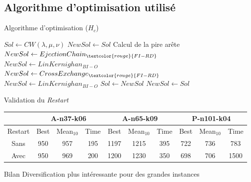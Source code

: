 \documentclass{beamer}
\begin{document}
\subsection{Algorithme d'optimisation utilisé}

\begin{frame}{Algorithme d'optimisation ($H_c$)}

\begin{algorithm}[H]
\DontPrintSemicolon %

$Sol \gets CW(\lambda,\mu,\nu)$\;
$NewSol \gets Sol$\;
 {
	Calcul de la pire arête\;
	$NewSol \gets EjectionChain_{\textcolor{rouge}{FI-RD}}$\;
	$NewSol \gets LinKernighan_{BI-O}$\;
	$NewSol \gets CrossExchange_{\textcolor{rouge}{FI-RD}}$\;
	$NewSol \gets LinKernighan_{BI-O}$\;
	 {
		$Sol \gets NewSol$\;
	}
	\textcolor{rouge}{
	 {  
		$NewSol \gets Sol$  
	}
	}
}
\;

\end{algorithm}

\end{frame}

\begin{frame}{Validation du \emph{Restart}}

\begin{table}[H]
\begin{tabular}{|@{}c@{}|@{}c@{}|@{}c@{}|@{}c@{}|@{}c@{}|@{}c@{}|@{}c@{}|@{}c@{}|@{}c@{}|@{}c@{}|}
   \hline
    & \multicolumn{3}{c|}{A-n37-k06} & \multicolumn{3}{c|}{A-n65-k09} & \multicolumn{3}{c|}{P-n101-k04} \\
   \hline
   Restart & Best & Mean$_{10}$ & Time & Best & Mean$_{10}$ & Time & Best & Mean$_{10}$ & Time \\
   \hline
   Sans &  950 & 957 & 195 & 1197 & 1215 & 395 & 722 & 736 & 783  \\   
   \hline
   Avec & 950 & 969 & 200 & 1200 & 1230 & 350 & 698 & 706 & 1500  \\
   \hline
\end{tabular}
\end{table}

\begin{exampleblock}{Bilan}
Diversification plus intéressante pour des grandes instances
\end{exampleblock}



\end{frame}
\end{document}
